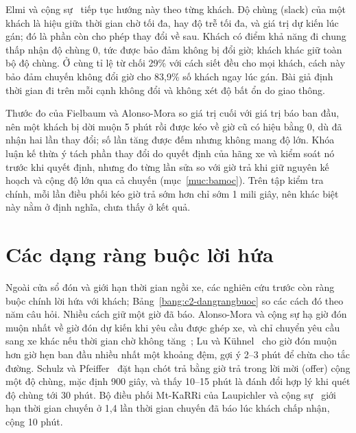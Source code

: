 Elmi và cộng sự~\cite{elmi2026} tiếp tục hướng này theo từng khách. Độ chùng (slack) của một khách là hiệu giữa thời
gian chờ tối đa, hay độ trễ tối đa, và giá trị dự kiến lúc gán; đó là phần còn cho phép thay đổi về sau. Khách có
điểm khả năng đi chung thấp nhận độ chùng 0, tức được bảo đảm không bị đổi giờ; khách khác giữ toàn bộ độ chùng. Ở
cùng tỉ lệ từ chối 29\% với cách siết đều cho mọi khách, cách này bảo đảm chuyến không đổi giờ cho 83,9\% số khách
ngay lúc gán. Bài giả định thời gian đi trên mỗi cạnh không đổi và không xét độ bất ổn do giao thông.

Thước đo của Fielbaum và Alonso-Mora so giá trị cuối với giá trị báo ban đầu, nên một khách bị dời muộn 5 phút rồi
được kéo về giờ cũ có hiệu bằng 0, dù đã nhận hai lần thay đổi; số lần tăng được đếm nhưng không mang độ lớn. Khóa
luận kế thừa ý tách phần thay đổi do quyết định của hãng xe và kiểm soát nó trước khi quyết định, nhưng đo từng lần
sửa so với giờ trả khi giữ nguyên kế hoạch và cộng độ lớn qua cả chuyến (mục~\ref{muc:bamoc}). Trên tập kiểm tra
chính, mỗi lần điều phối kéo giờ trả sớm hơn chỉ sớm 1 mili giây, nên khác biệt này nằm ở định nghĩa, chưa thấy ở
kết quả.

\section{Các dạng ràng buộc lời hứa}
\label{muc:c2-rangbuoc}

Ngoài cửa sổ đón và giới hạn thời gian ngồi xe, các nghiên cứu trước còn ràng buộc chính lời hứa với khách;
Bảng~\ref{bang:c2-dangrangbuoc} so các cách đó theo năm câu hỏi. Nhiều cách giữ một giờ đã báo. Alonso-Mora và cộng
sự hạ giờ đón muộn nhất về giờ đón dự kiến khi yêu cầu được ghép xe, và chỉ chuyển yêu cầu sang xe khác nếu thời
gian chờ không tăng~\cite{alonsomora2017}; Lu và Kühnel~\cite{lu2024} cho giờ đón muộn hơn giờ hẹn ban đầu nhiều
nhất một khoảng đệm, gợi ý 2--3 phút để chừa cho tắc đường. Schulz và Pfeiffer~\cite{schulz2026} đặt hạn chót trả
bằng giờ trả trong lời mời (offer) cộng một độ chùng, mặc định 900 giây, và thấy 10--15 phút là đánh đổi hợp lý khi
quét độ chùng tới 30 phút. Bộ điều phối Mt-KaRRi của Laupichler và cộng sự~\cite{laupichler2026} giới hạn thời gian
chuyến ở 1,4 lần thời gian chuyến đã báo lúc khách chấp nhận, cộng 10 phút.

